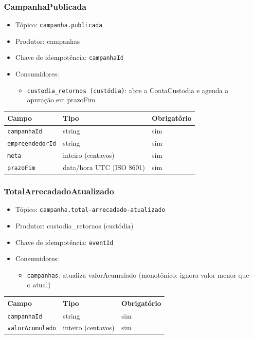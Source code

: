 \subsubsection{CampanhaPublicada}
\begin{itemize}
  \item Tópico: \texttt{campanha.publicada}
  \item Produtor: campanhas
  \item Chave de idempotência: \texttt{campanhaId}
  \item Consumidores:
  \begin{itemize}
    \item \texttt{custodia\_retornos (custódia)}: abre a ContaCustodia e agenda a apuração em prazoFim
  \end{itemize}
\end{itemize}
\begin{tabular}{lll}
\hline
Campo & Tipo & Obrigatório \\
\hline
\texttt{campanhaId} & string & sim \\
\texttt{empreendedorId} & string & sim \\
\texttt{meta} & inteiro (centavos) & sim \\
\texttt{prazoFim} & data/hora UTC (ISO 8601) & sim \\
\hline
\end{tabular}

\subsubsection{TotalArrecadadoAtualizado}
\begin{itemize}
  \item Tópico: \texttt{campanha.total-arrecadado-atualizado}
  \item Produtor: custodia\_retornos (custódia)
  \item Chave de idempotência: \texttt{eventId}
  \item Consumidores:
  \begin{itemize}
    \item \texttt{campanhas}: atualiza valorAcumulado (monotônico: ignora valor menor que o atual)
  \end{itemize}
\end{itemize}
\begin{tabular}{lll}
\hline
Campo & Tipo & Obrigatório \\
\hline
\texttt{campanhaId} & string & sim \\
\texttt{valorAcumulado} & inteiro (centavos) & sim \\
\hline
\end{tabular}

